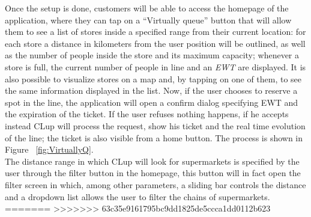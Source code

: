 Once the setup is done, customers will be able to access the homepage of the application, where they can tap on a “Virtually queue” button that will allow them to see a list of stores inside a specified range from their current location: for each store a distance in kilometers from the user position will be outlined, as well as the number of people inside the store and its maximum capacity; whenever a store is full, the current number of people in line and an \textit{EWT} are displayed.\newline  
It is also possible to visualize stores on a map and, by tapping on one of them, to see the same information displayed in the list. Now, if the user chooses to reserve a spot in the line, the application will open a confirm dialog specifying EWT and the expiration of the ticket. If the user refuses nothing happens, if he accepts instead CLup will process the request, show his ticket and the real time evolution of the line; the ticket is also visible from a home button. The process is shown in Figure ~\ref{fig:VirtuallyQ}.\\
The distance range in which CLup will look for supermarkets is specified by the user through the filter button in the homepage, this button will in fact open the filter screen in which, among other parameters, a sliding bar controls the distance and a dropdown list allows the user to filter the chains of supermarkets.\\
=======
>>>>>>> 63c35e9161795bc9dd1825de5ccca1dd0112b623

